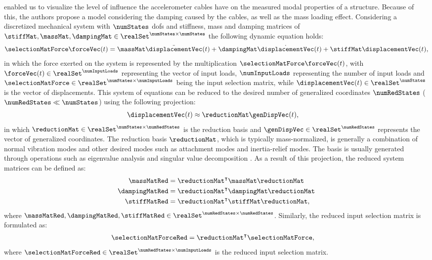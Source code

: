  enabled us to visualize the level of influence the accelerometer cables have on the measured modal properties of a structure. Because of this, the authors propose a model considering the damping caused by the cables, as well as the mass loading effect. Considering a discretized mechanical system with \(\numStates\) \glspl{dof} and stiffness, mass and damping matrices of \(\stiffMat,\massMat,\dampingMat \in \realSet^{\numStates \times \numStates}\) the following dynamic equation holds:
\begin{align}
    \selectionMatForce \forceVec (t) = \massMat \ddot{\displacementVec}(t) + \dampingMat \dot{\displacementVec}(t) + \stiffMat \displacementVec (t),
\end{align}
in which the force exerted on the system is represented by the multiplication \(\selectionMatForce \forceVec (t)\), with \(\forceVec (t) \in \realSet^{\numInputLoads}\) representing the vector of input loads, \(\numInputLoads\) representing the number of input loads and \(\selectionMatForce \in \realSet^{\numStates \times \numInputLoads}\) being the input selection matrix, while \(\displacementVec(t) \in \realSet^{\numStates}\) is the vector of displacements. This system of equations can be reduced to the desired number of generalized coordinates \(\numRedStates\) (\(\numRedStates \ll \numStates \)) using the following projection:
\begin{align}
    \displacementVec (t) & \approx \reductionMat \genDispVec (t),
\end{align}
in which \(\reductionMat \in \realSet^{\numStates \times \numRedStates}\) is the reduction basis and \( \genDispVec \in \realSet^{\numRedStates} \) represents the vector of generalized coordinates. The reduction basis \( \reductionMat \), which is typically mass-normalized, is generally a combination of normal vibration modes and other desired modes such as attachment modes and inertia-relief modes. The basis is usually generated through operations such as eigenvalue analysis and singular value decomposition \cite{besselink_comparison_2013}. As a result of this projection, the reduced system matrices can be defined as:
\begin{align}
    \massMatRed    & = \reductionMat^\intercal \massMat \reductionMat    \\
    \dampingMatRed & = \reductionMat^\intercal \dampingMat \reductionMat \\
    \stiffMatRed   & = \reductionMat^\intercal \stiffMat \reductionMat,
\end{align}
where \(\massMatRed,\dampingMatRed,\stiffMatRed \in \realSet^{\numRedStates \times \numRedStates}\). Similarly, the reduced input selection matrix is formulated as:
\begin{align}
    \selectionMatForceRed & = \reductionMat^\intercal \selectionMatForce,
\end{align}
where \( \selectionMatForceRed \in \realSet^{\numRedStates \times \numInputLoads} \) is the reduced input selection matrix.

